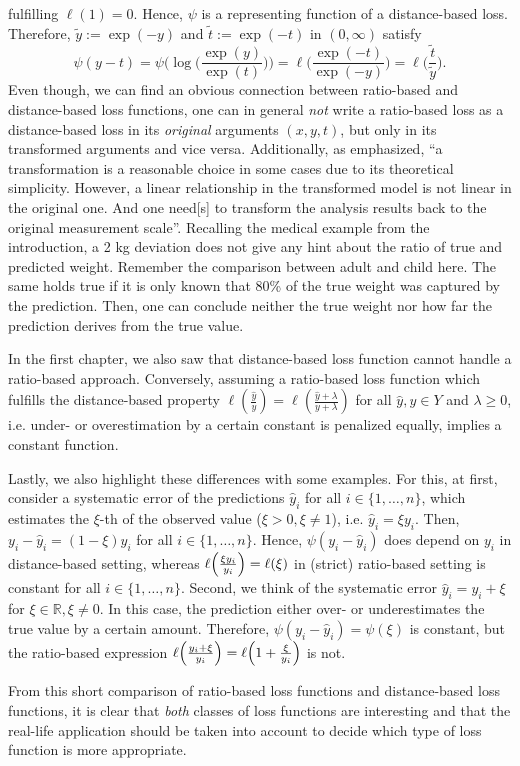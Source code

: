 \documentclass[10pt]{article}
\newcommand{\anf}[1]{\enquote{#1}}
\newcommand{\R}{\mathbb{R}}
\begin{document}
fulfilling $\ell(1) = 0$.
Hence, $\psi$ is a representing function of a distance-based loss.
Therefore, $\tilde{y} := \exp(-y)$ and $\tilde{t} := \exp(-t)$ in $(0, \infty)$ satisfy
\begin{equation*}
	\psi(y-t) = \psi\biggl(\log\biggl(\frac{\exp(y)}{\exp(t)}\biggr)\biggr) = \ell\biggl(\frac{\exp(-t)}{\exp(-y)}\biggr) = \ell\biggl(\frac{\tilde{t}}{\tilde{y}}\biggr).
\end{equation*}
Even though, we can find an obvious connection between ratio-based and distance-based loss functions, one can in general \emph{not} write a ratio-based loss as a distance-based loss in its \emph{original} arguments $(x,y,t)$, but only in its transformed arguments and vice versa. 
Additionally, as  \cite[Chapter 2]{ChenEtAl2010LARE} emphasized, \anf{a transformation is a reasonable choice in some cases due to its theoretical simplicity. However, a linear relationship in the transformed model is not linear in the original one. And one need[s] to transform the analysis results back to the original measurement scale}.
Recalling the medical example from the introduction, a 2 kg deviation does not give any hint about the ratio of true and predicted weight.
Remember the comparison between adult and child here.
The same holds true if it is only known that 80\% of the true weight was captured by the prediction. 
Then, one can conclude neither the true weight nor how far the prediction derives from the true value. \par
In the first chapter, we also saw that distance-based loss function cannot handle a ratio-based approach.
Conversely, assuming a ratio-based loss function which fulfills the distance-based property $\ell(\frac{\hat{y}}{y}) = \ell(\frac{\hat{y}+\lambda}{y+\lambda})$ for all $\hat{y}, y \in Y$ and $\lambda \geq 0$, i.e. under- or overestimation by a certain constant is penalized equally, implies a constant function.  \par 
Lastly, we also highlight these differences with some examples. 
For this, at first, consider a systematic error of the predictions $\hat{y}_i$ for all $i \in \{1, \dots, n\}$, which estimates the $\xi$-th of the observed value ($\xi > 0, \xi \neq 1$), i.e. $\hat{y}_i = \xi y_i$.
Then, $y_i-\hat{y}_i = (1-\xi)y_i$ for all $i \in \{1, \dots, n\}$.
Hence, $\psi(y_i-\hat{y}_i)$ does depend on $y_i$ in distance-based setting, whereas $\ell\Bigl(\frac{\xi y_i}{y_i}\Bigr) = \ell(\xi)$ in (strict) ratio-based setting is constant for all $i \in \{1, \dots, n\}$. 
Second, we think of the systematic error $\hat{y}_i = y_i + \xi$ for $\xi \in \R, \xi \neq 0$.
In this case, the prediction either over- or underestimates the true value by a certain amount.
Therefore, $\psi(y_i - \hat{y}_i) = \psi(\xi)$  is constant, but the ratio-based expression $\ell\Bigl(\frac{y_i+\xi}{y_i}\Bigr) = \ell\Bigl(1 + \frac{\xi}{y_i}\Bigr)$ is not.\par
From this short comparison of ratio-based loss functions and distance-based loss functions, it is clear that \emph{both} classes of loss functions are interesting and that the real-life application should be taken into account to decide which type of loss function is more appropriate.
\end{document}
